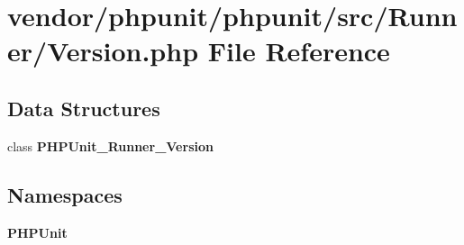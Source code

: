 \section{vendor/phpunit/phpunit/src/\+Runner/\+Version.php File Reference}
\label{phpunit_2phpunit_2src_2_runner_2_version_8php}
\subsection*{Data Structures}
\begin{DoxyCompactItemize}
\item 
class {\bf P\+H\+P\+Unit\+\_\+\+Runner\+\_\+\+Version}
\end{DoxyCompactItemize}
\subsection*{Namespaces}
\begin{DoxyCompactItemize}
\item 
 {\bf P\+H\+P\+Unit}
\end{DoxyCompactItemize}
